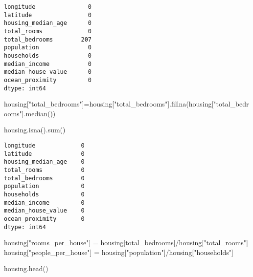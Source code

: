 \documentclass[
  letterpaper,
  DIV=11,
  numbers=noendperiod]{scrartcl}
\newenvironment{Shaded}{\begin{snugshade}}{\end{snugshade}}
\newcommand{\BuiltInTok}[1]{\textcolor[rgb]{0.00,0.23,0.31}{#1}}
\newcommand{\NormalTok}[1]{\textcolor[rgb]{0.00,0.23,0.31}{#1}}
\newcommand{\OperatorTok}[1]{\textcolor[rgb]{0.37,0.37,0.37}{#1}}
\newcommand{\StringTok}[1]{\textcolor[rgb]{0.13,0.47,0.30}{#1}}
\begin{document}
\begin{verbatim}
longitude               0
latitude                0
housing_median_age      0
total_rooms             0
total_bedrooms        207
population              0
households              0
median_income           0
median_house_value      0
ocean_proximity         0
dtype: int64
\end{verbatim}

\begin{Shaded}
\begin{Highlighting}[]
\NormalTok{housing[}\StringTok{"total\_bedrooms"}\NormalTok{]}\OperatorTok{=}\NormalTok{housing[}\StringTok{"total\_bedrooms"}\NormalTok{].fillna(housing[}\StringTok{"total\_bedrooms"}\NormalTok{].median())}
\end{Highlighting}
\end{Shaded}

\begin{Shaded}
\begin{Highlighting}[]
\NormalTok{housing.isna().}\BuiltInTok{sum}\NormalTok{()}
\end{Highlighting}
\end{Shaded}

\begin{verbatim}
longitude             0
latitude              0
housing_median_age    0
total_rooms           0
total_bedrooms        0
population            0
households            0
median_income         0
median_house_value    0
ocean_proximity       0
dtype: int64
\end{verbatim}

\begin{Shaded}
\begin{Highlighting}[]
\NormalTok{housing[}\StringTok{"rooms\_per\_house"}\NormalTok{] }\OperatorTok{=}\NormalTok{ housing[}\StringTok{\textquotesingle{}total\_bedrooms\textquotesingle{}}\NormalTok{]}\OperatorTok{/}\NormalTok{housing[}\StringTok{"total\_rooms"}\NormalTok{]}
\NormalTok{housing[}\StringTok{"people\_per\_house"}\NormalTok{] }\OperatorTok{=}\NormalTok{ housing[}\StringTok{"population"}\NormalTok{]}\OperatorTok{/}\NormalTok{housing[}\StringTok{"households"}\NormalTok{]}
\end{Highlighting}
\end{Shaded}

\begin{Shaded}
\begin{Highlighting}[]
\NormalTok{housing.head()}
\end{Highlighting}
\end{Shaded}
\end{document}
